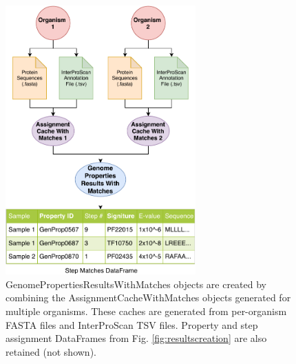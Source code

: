 \begin{figure}[!ht]
  \centering
	\includegraphics[width=0.65\textwidth]{media/assignment_results_with_matches_overview.pdf}
	 \caption{GenomePropertiesResultsWithMatches objects are created by combining the AssignmentCacheWithMatches objects generated for multiple organisms. These caches are generated from per-organism FASTA files and InterProScan TSV files. Property and step assignment DataFrames from Fig. \ref{fig:resultscreation} are also retained (not shown).}
	 \label{fig:resultswithmatchescreation}
\end{figure} 

